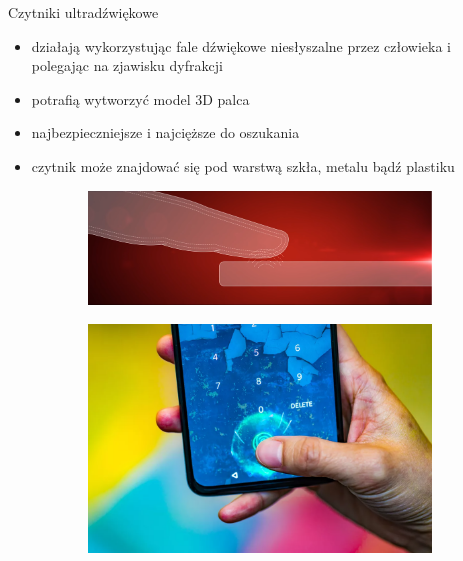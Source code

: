 \documentclass{beamer}
\begin{document}
\begin{frame}{Czytniki ultradźwiękowe}
    \begin{itemize}
        \item działają wykorzystując fale dźwiękowe niesłyszalne przez człowieka i polegając na zjawisku dyfrakcji
        \item potrafią wytworzyć model 3D palca
        \item najbezpieczniejsze i najcięższe do oszukania
        \item czytnik może znajdować się pod warstwą szkła, metalu bądź plastiku
    \end{itemize}
    \begin{figure}
        \centering
        \begin{subfigure}{.49\textwidth}
            \centering
            \includegraphics[width=\linewidth]{types/ultrasonic.png}
        \end{subfigure}
        \begin{subfigure}{.49\textwidth}
            \centering
            \includegraphics[width=0.7\linewidth]{types/oneplus-6t-3435.png}
        \end{subfigure}
    \end{figure}
\end{frame}
\end{document}

